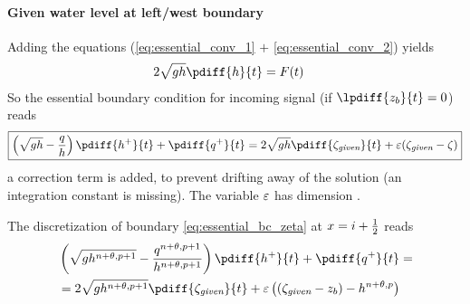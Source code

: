 %
\paragraph*{Given water level at left/west boundary}


Adding the equations (\eqref{eq:essential_conv_1} $+$ \eqref{eq:essential_conv_2}) yields
\begin{align}
    2 \sqrt{gh} \pdiff{h}{t} & = F(t)
\end{align}
%
So the essential boundary condition for incoming signal (if $\lpdiff{z_b}{t} = 0$) reads
\begin{align}
    {\boxed{
            \left(\sqrt{gh} - \frac{q}{h}\right) \pdiff{h^{+}}{t} + \pdiff{q^{+}}{t}  = 2 \sqrt{gh} \pdiff{\zeta_{\textit{given}}}{t}  + \eps(\zeta_{\textit{given}} - \zeta)
    }}\label{eq:essential_bc_zeta}
\end{align}
a correction term is added, to prevent drifting away of the solution (an integration constant is missing).
The variable $\varepsilon$ has dimension \bunit{\metre\per\square\second}.

The discretization of  boundary \autoref{eq:essential_bc_zeta} at $x=i+\frac{1}{2}$ reads
\begin{align}
    &\left(\sqrt{gh^{n+\theta,p+1}} - \frac{q^{n+\theta,p+1}}{h^{n+\theta,p+1}}\right) \pdiff{h^{+}}{t} + \pdiff{q^{+}}{t}  =
    \nonumber \\*
    & = 2 \sqrt{gh^{n+\theta,p+1}} \pdiff{\zeta_{\textit{given}}}{t}
    + \eps \left( (\zeta_{\textit{given}} -z_b) - h^{n+\theta,p}   \right)
\end{align}

%
